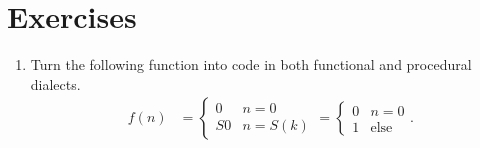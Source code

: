 
\section*{Exercises}

\begin{enumerate}
    \item Turn the following function into code in both functional and procedural dialects.
    \begin{align*}
        f(n) & = \begin{cases}
                    0 & n=0\\
                    S0 & n=S(k)
        \end{cases}
         =\begin{cases} 0 & n=0 \\ 1 & \text{else}\end{cases}.
    \end{align*}
    
    
\end{enumerate}